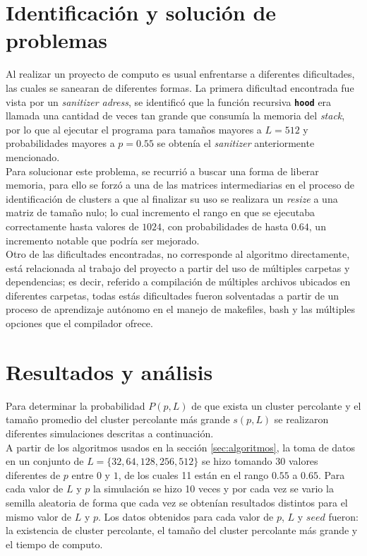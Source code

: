 \documentclass[11pt,twocolumn]{article}
\begin{document}
\section{\textbf{Identificación y solución de problemas}}
 \label{sec:problems}
 Al realizar un proyecto de computo es usual enfrentarse a diferentes dificultades, las cuales se sanearan de diferentes formas. La primera dificultad encontrada fue vista por un \textit{sanitizer adress}, se identificó que la función recursiva \texttt{\textbf{hood}} era llamada una cantidad de veces tan grande que consumía la memoria del \textit{stack}, por lo que al ejecutar el programa para tamaños mayores a $L=512$ y probabilidades mayores a $p=0.55$ se obtenía el \textit{sanitizer} anteriormente mencionado. \\
 Para solucionar este problema, se recurrió a buscar una forma de liberar memoria, para ello se forzó a una de las matrices intermediarias en el proceso de identificación de clusters a que al finalizar su uso se realizara un \textit{resize} a una matriz de tamaño nulo; lo cual incremento el rango en que se ejecutaba correctamente hasta valores de $1024$, con probabilidades de hasta $0.64$, un incremento notable que podría ser mejorado.\\
 Otro de las dificultades encontradas, no corresponde al algoritmo directamente, está relacionada al trabajo del proyecto a partir del uso de múltiples carpetas y dependencias; es decir, referido a compilación de múltiples archivos ubicados en diferentes carpetas, todas estás dificultades fueron solventadas a partir de un proceso de aprendizaje autónomo en el manejo de makefiles, bash y las múltiples opciones que el compilador ofrece.

\section{\textbf{Resultados y análisis}}
Para determinar la probabilidad $P(p,L)$ de que exista un cluster percolante y el tamaño promedio del cluster percolante más grande $s(p,L)$ se realizaron diferentes simulaciones descritas a continuación. \\
A partir de los algoritmos usados en la sección \ref{sec:algoritmos}, la toma de datos en un conjunto de $L=\{32, 64, 128, 256, 512\}$ se hizo tomando 30 valores diferentes de $p$ entre $0$ y $1$, de los cuales 11 están en el rango $0.55$ a $0.65$. Para cada valor de $L$ y $p$ la simulación se hizo 10 veces y por cada vez se vario la semilla aleatoria de forma que cada vez se obtenían resultados distintos para el mismo valor de $L$ y $p$. Los datos obtenidos para cada valor de $p$, $L$ y $seed$ fueron: la existencia de cluster percolante, el tamaño del cluster percolante más grande y el tiempo de computo.
\end{document}
